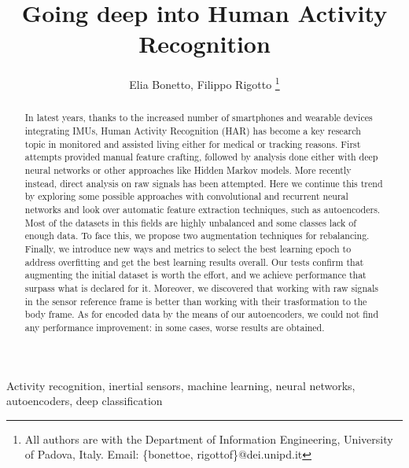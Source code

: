 \documentclass[10pt, conference, letterpaper]{IEEEtran}
\title{Going deep into Human Activity Recognition}
\author{Elia Bonetto, Filippo Rigotto
\thanks{All authors are with the Department of Information Engineering, University of Padova, Italy. Email: \{bonettoe, rigottof\}@dei.unipd.it}}
\newcommand\MR[1]{\textcolor{blue}{#1}}
\begin{document}
\maketitle

\begin{abstract}
In latest years, thanks to the increased number of smartphones and wearable devices integrating IMUs, Human Activity Recognition (HAR) has become a key research topic in monitored and assisted living either for medical or tracking reasons.
First attempts provided manual feature crafting, followed by analysis done either with deep neural networks or other approaches like Hidden Markov models.
More recently instead, direct analysis on raw signals has been attempted.
Here we continue this trend by exploring some possible approaches with convolutional and recurrent neural networks and look over automatic feature extraction techniques, such as autoencoders.
Most of the datasets in this fields are highly unbalanced and some classes lack of enough data.
To face this, we propose two augmentation techniques for rebalancing.
Finally, we introduce new ways and metrics to select the best learning epoch to address overfitting and get the best learning results overall.
Our tests confirm that augmenting the initial dataset is worth the effort, and we achieve performance that surpass what is declared for it.
Moreover, we discovered that working with raw signals in the sensor reference frame is better than working with their trasformation to the body frame. 
As for encoded data by the means of our autoencoders, we could not find any performance improvement: in some cases, worse results are obtained.
\end{abstract}

\begin{IEEEkeywords}
Activity recognition, inertial sensors, machine learning, neural networks, autoencoders, deep classification
\end{IEEEkeywords}









\end{document}
